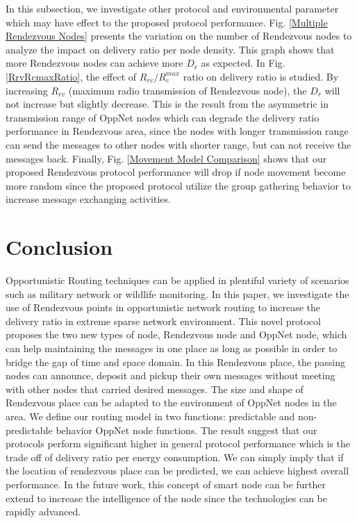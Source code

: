 \documentclass[conference]{IEEEtran}
\begin{document}
In this subsection, we investigate other protocol and environmental parameter which may have effect to the proposed protocol performance.
%
Fig. \ref{Multiple Rendezvous Nodes} presents the variation on the number of Rendezvous nodes to analyze the impact on delivery ratio per node density.
%
This graph shows that more Rendezvous nodes can achieve more $D_r$ as expected.
%
In Fig. \ref{RrvRcmaxRatio}, the effect of $R_{rv}/R_c^{max}$ ratio on delivery ratio is studied.
% 
By increasing $R_{rv}$ (maximum radio transmission of Rendezvous node), the $D_r$ will not increase but slightly decrease.
%
This is the result from the asymmetric in transmission range of OppNet nodes which can degrade the delivery ratio performance in Rendezvous area, since the nodes with longer transmission range can send the messages to other nodes with shorter range, but can not receive the messages back.
Finally, Fig. \ref{Movement Model Comparison} shows that our proposed Rendezvous protocol performance will drop if node movement become more random since the proposed protocol utilize the group gathering behavior to increase message exchanging activities.


\section{Conclusion}
Opportunistic Routing techniques can be applied in  plentiful variety of scenarios such as military network or wildlife monitoring. 
%
In this paper, we investigate the use of Rendezvous points in opportunistic network routing to increase the delivery ratio in extreme sparse network environment.
%
This novel protocol proposes the two new types of node, Rendezvous node and OppNet node, which can help maintaining the messages in one place as long as possible in order to bridge the gap of time and space domain.
%
In this Rendezvous place, the passing nodes can announce, deposit and pickup their own messages without meeting with other nodes that carried desired messages.
%
The size and shape of  Rendezvous place can be adapted to the environment of OppNet nodes in the area.
%
We define our routing model in two functions: predictable  and non-predictable behavior OppNet node functions.
%
The result suggest that our protocols perform significant higher in general protocol performance which is the trade off of delivery ratio per energy consumption.
%
We can simply imply that if the location of rendezvous place can be predicted, we can achieve highest overall performance.
In the future work, this concept of smart node can be further extend to increase the intelligence of the node since the technologies can be rapidly advanced.
\end{document}
